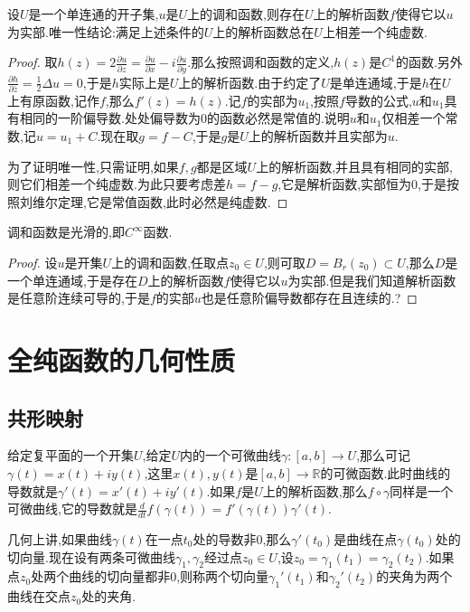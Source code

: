 设$U$是一个单连通的开子集,$u$是$U$上的调和函数,则存在$U$上的解析函数$f$使得它以$u$为实部.唯一性结论:满足上述条件的$U$上的解析函数总在$U$上相差一个纯虚数.
\begin{proof}
	
	取$h(z)=2\frac{\partial u}{\partial z}=\frac{\partial u}{\partial x}-i\frac{\partial u}{\partial y}$.那么按照调和函数的定义,$h(z)$是$C^1$的函数.另外$\frac{\partial h}{\partial\overline{z}}=\frac{1}{2}\Delta u=0$,于是$h$实际上是$U$上的解析函数.由于约定了$U$是单连通域,于是$h$在$U$上有原函数,记作$f$,那么$f'(z)=h(z)$.记$f$的实部为$u_1$,按照$f$导数的公式,$u$和$u_1$具有相同的一阶偏导数.处处偏导数为0的函数必然是常值的.说明$u$和$u_1$仅相差一个常数,记$u=u_1+C$.现在取$g=f-C$,于是$g$是$U$上的解析函数并且实部为$u$.
	
	为了证明唯一性,只需证明,如果$f,g$都是区域$U$上的解析函数,并且具有相同的实部,则它们相差一个纯虚数.为此只要考虑差$h=f-g$,它是解析函数,实部恒为0,于是按照刘维尔定理,它是常值函数,此时必然是纯虚数.
\end{proof}

调和函数是光滑的,即$C^{\infty}$函数.
\begin{proof}
	
	设$u$是开集$U$上的调和函数,任取点$z_0\in U$,则可取$D=B_r(z_0)\subset U$,那么$D$是一个单连通域,于是存在$D$上的解析函数$f$使得它以$u$为实部.但是我们知道解析函数是任意阶连续可导的,于是$f$的实部$u$也是任意阶偏导数都存在且连续的.?
\end{proof}




\newpage
\section{全纯函数的几何性质}
\subsection{共形映射}

给定复平面的一个开集$U$,给定$U$内的一个可微曲线$\gamma:[a,b]\to U$,那么可记$\gamma(t)=x(t)+iy(t)$,这里$x(t),y(t)$是$[a,b]\to\mathbb{R}$的可微函数.此时曲线的导数就是$\gamma'(t)=x'(t)+iy'(t)$.如果$f$是$U$上的解析函数,那么$f\circ\gamma$同样是一个可微曲线,它的导数就是$\frac{d}{dt}f(\gamma(t))=f'(\gamma(t))\gamma'(t)$.

几何上讲,如果曲线$\gamma(t)$在一点$t_0$处的导数非0,那么$\gamma'(t_0)$是曲线在点$\gamma(t_0)$处的切向量.现在设有两条可微曲线$\gamma_1,\gamma_2$经过点$z_0\in U$,设$z_0=\gamma_1(t_1)=\gamma_2(t_2)$.如果点$z_0$处两个曲线的切向量都非0,则称两个切向量$\gamma_1'(t_1)$和$\gamma_2'(t_2)$的夹角为两个曲线在交点$z_0$处的夹角.


